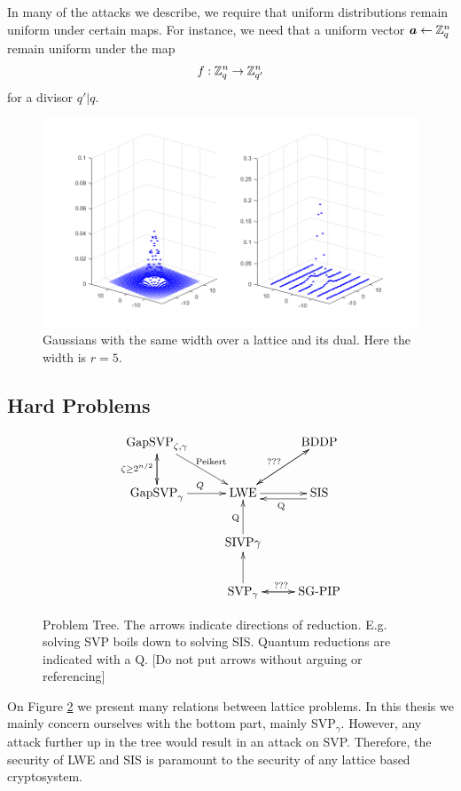     In many of the attacks we describe, we require that uniform distributions remain uniform under certain maps. For instance, we need that a uniform vector \(\boldsymbol{a} \leftarrow \mathbb{Z}_q^n\) remain uniform under the map
    \begin{align*}
        f:\mathbb{Z}_q^n \rightarrow \mathbb{Z}_{q'}^n
    \end{align*}
    for a divisor \(q'|q\).
    
    \begin{figure}
        \centering
        \includegraphics[scale = .45]{./figures/fig1.png}
        \caption{Gaussians with the same width over a lattice and its dual. Here the width is \(r = 5\).}
        \label{fig:Gaussian over Lattice}
    \end{figure}

\subsection{Hard Problems}
    \begin{figure}[h]
        \label{Figure: Problem Tree}
        \[\xymatrix{
            \text{GapSVP}_{\zeta, \gamma} \ar[dr]^{\text{Peikert}}\ar[d]_{\zeta\geq 2^{n/2}}&&\text{BDDP}\ar[dl]\\
            \text{GapSVP}_\gamma\ar[r]^{Q}\ar[u] &  \text{LWE}\ar[r]\ar[ur]^{???} & \text{SIS}\ar@<1ex>[l]^{\text{Q}}\\
                                &  \text{SIVP}\gamma\ar[u]^{\text{Q}}& \\
                                &  \text{SVP}_\gamma\ar[u]\ar[r]^{???} & \text{SG-PIP}\ar[l]
        }\]
        \caption{Problem Tree. The arrows indicate directions of reduction. E.g. solving SVP boils down to solving SIS. Quantum reductions are indicated with a Q. [Do not put arrows without arguing or referencing]}
    \end{figure}
    On Figure \ref{Figure: Problem Tree} we present many relations between lattice problems. In this thesis we mainly concern ourselves with the bottom part, mainly SVP\(_\gamma\). However, any attack further up in the tree would result in an attack on SVP. Therefore, the security of LWE and SIS is paramount to the security of any lattice based cryptosystem. \par
    
